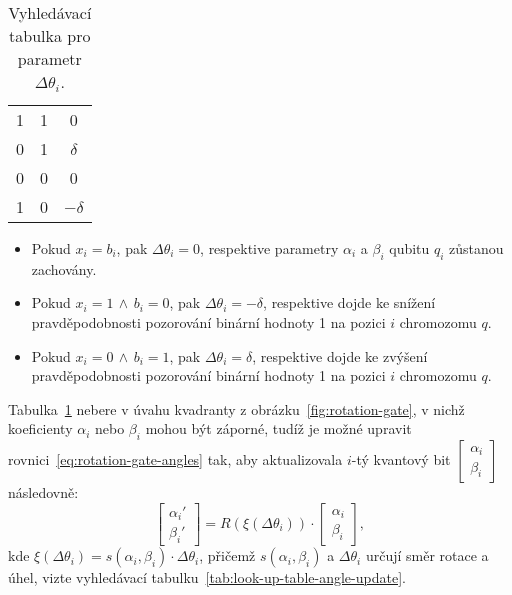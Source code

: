 \begin{enumerate}
\begin{table}[ht!]
\begin{tabular}{|c c|c|}
            1     & 1     & 0                \\ 
            0     & 1     & $\delta$              \\ 
            0     & 0     & 0                \\ 
            1     & 0     & $-\delta$             \\
            \hline
            \end{tabular}
            \caption{Vyhledávací tabulka pro parametr $\Delta\theta_i$.}
            \label{tab:look-up-table-Delta}
        \end{table}
        \begin{itemize}
            \item Pokud $x_i = b_i$, pak $\Delta\theta_i = 0$, respektive parametry $\alpha_i$ a $\beta_i$ qubitu $q_i$ zůstanou zachovány.
            \item Pokud $x_i = 1\,\wedge\,b_i = 0$, pak $\Delta\theta_i = -\delta$, respektive dojde ke snížení pravděpodobnosti pozorování binární hodnoty 1 na pozici $i$ chromozomu $q$. 
            \item Pokud $x_i = 0\,\wedge\,b_i = 1$, pak $\Delta\theta_i =  \delta$, respektive dojde ke zvýšení pravděpodobnosti pozorování binární hodnoty 1 na pozici $i$ chromozomu $q$. 
        \end{itemize}
        Tabulka~\ref{tab:look-up-table-Delta} nebere v úvahu kvadranty z obrázku~\ref{fig:rotation-gate}, v nichž koeficienty $\alpha_i$ nebo $\beta_i$ mohou být záporné, tudíž je možné upravit rovnici~\ref{eq:rotation-gate-angles} tak, aby aktualizovala $i$-tý kvantový bit $\begin{bmatrix} \alpha_i \\ \beta_i \end{bmatrix}$ následovně:
        \begin{equation}\label{eq:rotation-gate-angles-update}
            \begin{bmatrix}
                \alpha_i' \\
                \beta_i' 
            \end{bmatrix}
            =
            R\left(\xi \left( \Delta\theta_i \right)\right) \cdot
            \begin{bmatrix}
                \alpha_i \\
                \beta_i 
            \end{bmatrix},
        \end{equation}
        kde $\xi \left( \Delta\theta_i \right) = s\left( \alpha_i , \beta_i \right) \cdot \Delta\theta_i $, přičemž $s\left( \alpha_i , \beta_i \right)$ a $\Delta\theta_i$ určují směr rotace a úhel, vizte vyhledávací tabulku~\ref{tab:look-up-table-angle-update}.

\end{enumerate}
